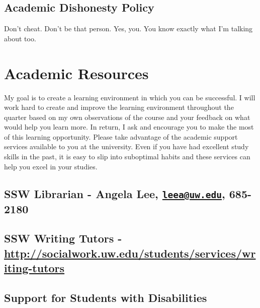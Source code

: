 \documentclass[11pt,]{article}
\begin{document}
\subsection{Academic Dishonesty
Policy}\label{academic-dishonesty-policy}

Don't cheat. Don't be that person. Yes, you. You know exactly what I'm
talking about too.

\section{Academic Resources}\label{academic-resources}

My goal is to create a learning environment in which you can be
successful. I will work hard to create and improve the learning
environment throughout the quarter based on my own observations of the
course and your feedback on what would help you learn more. In return, I
ask and encourage you to make the most of this learning opportunity.
Please take advantage of the academic support services available to you
at the university. Even if you have had excellent study skills in the
past, it is easy to slip into suboptimal habits and these services can
help you excel in your studies.

\subsection{\texorpdfstring{SSW Librarian - Angela Lee,
\href{mailto:leea@uw.edu}{\nolinkurl{leea@uw.edu}},
685-2180}{SSW Librarian - Angela Lee, leea@uw.edu, 685-2180}}\label{ssw-librarian---angela-lee-leeauw.edu-685-2180}

\subsection{\texorpdfstring{SSW Writing Tutors -
\url{http://socialwork.uw.edu/students/services/writing-tutors}}{SSW Writing Tutors - http://socialwork.uw.edu/students/services/writing-tutors}}\label{ssw-writing-tutors---httpsocialwork.uw.edustudentsserviceswriting-tutors}

\subsection{Support for Students with
Disabilities}\label{support-for-students-with-disabilities}
\end{document}
